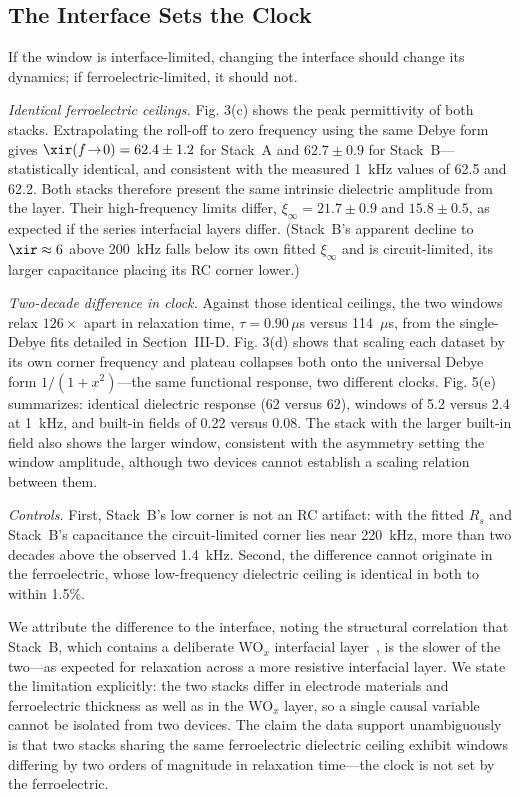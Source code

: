 \subsection{The Interface Sets the Clock}
If the window is interface-limited, changing the interface should change its
dynamics; if ferroelectric-limited, it should not.

\textit{Identical ferroelectric ceilings.} Fig. 3(c) shows
the peak permittivity of both stacks. Extrapolating the roll-off to zero
frequency using the same Debye form gives $\xir(f\!\rightarrow\!0) =
62.4 \pm 1.2$ for Stack~A and $62.7 \pm 0.9$ for Stack~B---statistically
identical, and consistent with the measured 1~kHz values of 62.5 and 62.2.
Both stacks therefore present the same intrinsic dielectric amplitude from
the \hzo{} layer. Their high-frequency limits differ,
$\xi_\infty = 21.7 \pm 0.9$ and $15.8 \pm 0.5$, as expected if the series
interfacial layers differ. (Stack~B's apparent decline to $\xir \approx 6$
above 200~kHz falls below its own fitted $\xi_\infty$ and is circuit-limited,
its larger capacitance placing its RC corner lower.)

\textit{Two-decade difference in clock.} Against those identical ceilings,
the two windows relax $126\times$ apart in relaxation time,
$\tau = 0.90\,\mu$s versus 114~$\mu$s, from the single-Debye fits detailed in
Section~III-D. Fig. 3(d) shows that scaling each dataset by
its own corner frequency and plateau collapses both onto the universal Debye
form $1/(1+x^2)$---the same functional response, two different clocks.
Fig. 5(e) summarizes: identical dielectric response (62
versus 62), windows of 5.2 versus 2.4 at 1~kHz, and built-in fields of 0.22
versus 0.08\MVcm{}. The stack with the larger built-in field also shows the
larger window, consistent with the asymmetry setting the window amplitude,
although two devices cannot establish a scaling relation between them.

\textit{Controls.} First, Stack~B's low corner is not an RC artifact: with
the fitted $R_s$ and Stack~B's capacitance the circuit-limited corner lies
near 220~kHz, more than two decades above the observed 1.4~kHz. Second, the
difference cannot originate in the ferroelectric, whose low-frequency
dielectric ceiling is identical in both to within 1.5\%.

We attribute the difference to the interface, noting the structural
correlation that Stack~B, which contains a deliberate WO$_x$ interfacial
layer~\cite{paul2026wox}, is the slower of the two---as expected for
relaxation across a more resistive interfacial layer. We state the limitation
explicitly: the two stacks differ in electrode materials and ferroelectric
thickness as well as in the WO$_x$ layer, so a single causal variable cannot
be isolated from two devices. The claim the data support unambiguously is
that two stacks sharing the same ferroelectric dielectric ceiling exhibit
windows differing by two orders of magnitude in relaxation time---the clock
is not set by the ferroelectric.

